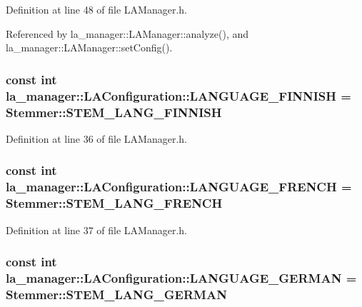 Definition at line 48 of file LAManager.h.

Referenced by la\_\-manager::LAManager::analyze(), and la\_\-manager::LAManager::setConfig().\hypertarget{classla__manager_1_1LAConfiguration_d4b37020e4318e3afce31fbbe993f74d}{
\subsubsection[{LANGUAGE\_\-FINNISH}]{\setlength{\rightskip}{0pt plus 5cm}const int {\bf la\_\-manager::LAConfiguration::LANGUAGE\_\-FINNISH} = Stemmer::STEM\_\-LANG\_\-FINNISH}}
\label{classla__manager_1_1LAConfiguration_d4b37020e4318e3afce31fbbe993f74d}




Definition at line 36 of file LAManager.h.\hypertarget{classla__manager_1_1LAConfiguration_b2dce069bbee79d19e35cbfd624d7078}{
\subsubsection[{LANGUAGE\_\-FRENCH}]{\setlength{\rightskip}{0pt plus 5cm}const int {\bf la\_\-manager::LAConfiguration::LANGUAGE\_\-FRENCH} = Stemmer::STEM\_\-LANG\_\-FRENCH}}
\label{classla__manager_1_1LAConfiguration_b2dce069bbee79d19e35cbfd624d7078}




Definition at line 37 of file LAManager.h.\hypertarget{classla__manager_1_1LAConfiguration_6443ae7996afe191eff4dffeeba61468}{
\subsubsection[{LANGUAGE\_\-GERMAN}]{\setlength{\rightskip}{0pt plus 5cm}const int {\bf la\_\-manager::LAConfiguration::LANGUAGE\_\-GERMAN} = Stemmer::STEM\_\-LANG\_\-GERMAN}}
\label{classla__manager_1_1LAConfiguration_6443ae7996afe191eff4dffeeba61468}




